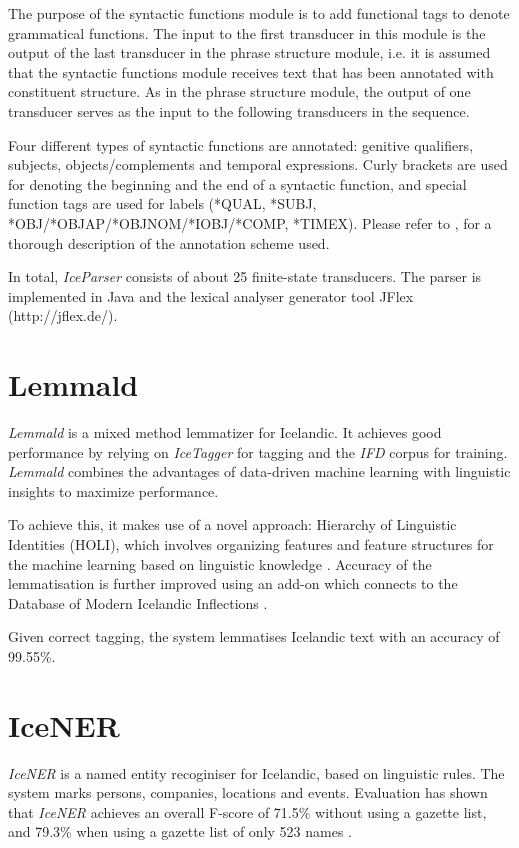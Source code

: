 \documentclass[11pt]{article}
\begin{document}
The purpose of the syntactic functions module is to add functional tags to denote grammatical functions.
The input to the first transducer in this module is the output of the last transducer in the phrase structure module, i.e. it is assumed that the syntactic functions module receives text that has been annotated with constituent structure.
As in the phrase structure module, the output of one transducer serves as the input to the following transducers in the sequence.

Four different types of syntactic functions are annotated: genitive qualifiers, subjects, objects/complements and temporal expressions.
Curly brackets are used for denoting the beginning and the end of a syntactic function, and special function tags are used for labels (*QUAL, *SUBJ, *OBJ/*OBJAP/*OBJNOM/*IOBJ/*COMP, *TIMEX).
Please refer to \citep{lof06c}, for a thorough description of the annotation scheme used.

In total, \emph{IceParser} consists of about 25 finite-state transducers.
The parser is implemented in Java and the lexical analyser generator tool JFlex (http://jflex.de/).

\section{Lemmald}
\emph{Lemmald} is a mixed method lemmatizer for Icelandic.
It achieves good performance by relying on \emph{IceTagger} for tagging and the \emph{IFD} corpus for training.
\emph{Lemmald} combines the advantages of data-driven machine learning with linguistic insights to maximize performance.

To achieve this, it makes use of a novel approach: Hierarchy of Linguistic Identities (HOLI), which involves organizing features and feature structures for the machine learning based on linguistic knowledge \citep{ant08}.
Accuracy of the lemmatisation is further improved using an add-on which connects to the Database of Modern Icelandic Inflections \citep{kri05}.

Given correct tagging, the system lemmatises Icelandic text with an accuracy of 99.55\%.

\section{IceNER}
\emph{IceNER} is a named entity recoginiser for Icelandic, based on linguistic rules.
The system marks persons, companies, locations and events.
Evaluation has shown that \emph{IceNER} achieves an overall F-score of 71.5\% without using a gazette list, and 79.3\% when using a gazette list of only 523 names \citep{try09}.
\end{document}
